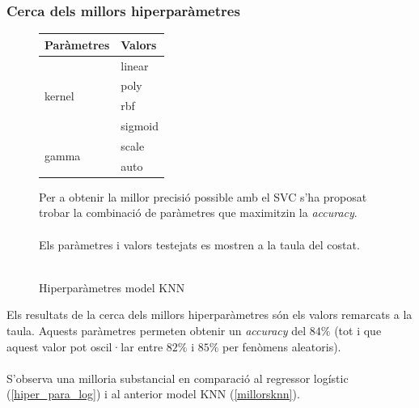 \documentclass[a4paper, 11pt]{article}
\begin{document}
\subsubsection{Cerca dels millors hiperparàmetres} \label{hiper_par_SVC}
\begin{figure}[h] %
\begin{minipage}{8cm} %
\begin{center} %
    \begin{tabular}{l|l}
        \textbf{Paràmetres} & \textbf{Valors} \\\hline\hline
        \multirow{4}{*}{kernel} & linear\\
        &poly\\
        &\cellcolor{lightapricot}rbf\\
        &sigmoid\\ \hline
        \multirow{2}{*}{gamma} & \cellcolor{lightapricot}scale\\
        & auto\\
    \end{tabular}
    \caption{Hiperparàmetres model KNN}
    \label{tab:afins}
\end{center}
\end{minipage} %
\hspace{2em}
\begin{minipage}{6.5cm} %
Per a obtenir la millor precisió possible amb el SVC s'ha proposat trobar la combinació de paràmetres que maximitzin la \textit{accuracy}.\\\\ Els paràmetres i valors testejats es mostren a la taula del costat.\\\\

\end{minipage} %
\end{figure} %
\hspace{-1.6em}Els resultats de la cerca dels millors hiperparàmetres són els valors remarcats a la taula. Aquests paràmetres permeten obtenir un \textit{accuracy} del $84\%$ (tot i que aquest valor pot oscil·lar entre $82\%$ i $85\%$ per fenòmens aleatoris).\\\\ S'observa una milloria substancial en comparació al regressor logístic (\textcolor{blue}{\ref{hiper_para_log}}) i al anterior model KNN (\textcolor{blue}{\ref{millorsknn}}).\\
\end{document}

